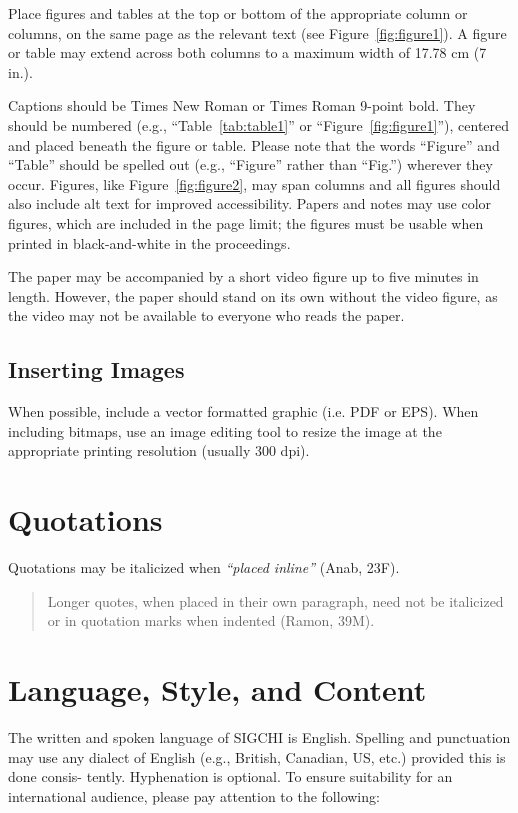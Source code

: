 \documentclass{sigchi}
\begin{document}
Place figures and tables at the top or bottom of the appropriate
column or columns, on the same page as the relevant text (see
Figure~\ref{fig:figure1}). A figure or table may extend across both
columns to a maximum width of 17.78 cm (7 in.).

Captions should be Times New Roman or Times Roman 9-point bold.  They
should be numbered (e.g., ``Table~\ref{tab:table1}'' or
``Figure~\ref{fig:figure1}''), centered and placed beneath the figure
or table.  Please note that the words ``Figure'' and ``Table'' should
be spelled out (e.g., ``Figure'' rather than ``Fig.'') wherever they
occur. Figures, like Figure~\ref{fig:figure2}, may span columns and
all figures should also include alt text for improved accessibility.
Papers and notes may use color figures, which are included in the page
limit; the figures must be usable when printed in black-and-white in
the proceedings.

The paper may be accompanied by a short video figure up to five
minutes in length. However, the paper should stand on its own without
the video figure, as the video may not be available to everyone who
reads the paper.  

\subsection{Inserting Images}
When possible, include a vector formatted graphic (i.e. PDF or EPS).
When including bitmaps,  use an image editing tool to resize the image
at the appropriate printing resolution (usually 300 dpi).

\section{Quotations}
Quotations may be italicized when \textit{``placed inline''} (Anab,
23F).

\begin{quote}
Longer quotes, when placed in their own paragraph, need not be
italicized or in quotation marks when indented (Ramon, 39M).  
\end{quote}

\section{Language, Style, and Content}

The written and spoken language of SIGCHI is English. Spelling and
punctuation may use any dialect of English (e.g., British, Canadian,
US, etc.) provided this is done consis- tently. Hyphenation is
optional. To ensure suitability for an international audience, please
pay attention to the following:
\end{document}
